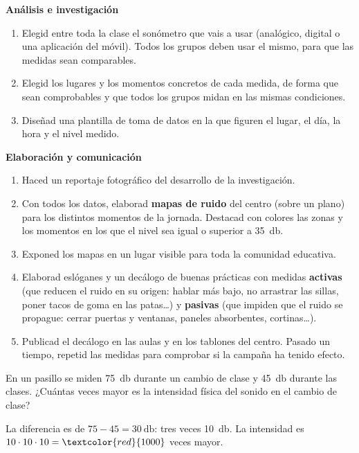 \textbf{Análisis e investigación}
\begin{enumerate}[label=\numberballred]
    \item Elegid entre toda la clase el sonómetro que vais a usar (analógico, digital o una aplicación del móvil). Todos los grupos deben usar el mismo, para que las medidas sean comparables.
    \item Elegid los lugares y los momentos concretos de cada medida, de forma que sean comprobables y que todos los grupos midan en las mismas condiciones.
    \item Diseñad una plantilla de toma de datos en la que figuren el lugar, el día, la hora y el nivel medido.
\end{enumerate}

\textbf{Elaboración y comunicación}
\begin{enumerate}[label=\numberballred, resume]
    \item Haced un reportaje fotográfico del desarrollo de la investigación.
    \item Con todos los datos, elaborad \textbf{mapas de ruido} del centro (sobre un plano) para los distintos momentos de la jornada. Destacad con colores las zonas y los momentos en los que el nivel sea igual o superior a \qty{35}{\decibel}.
    \item Exponed los mapas en un lugar visible para toda la comunidad educativa.
    \item Elaborad eslóganes y un decálogo de buenas prácticas con medidas \textbf{activas} (que reducen el ruido en su origen: hablar más bajo, no arrastrar las sillas, poner tacos de goma en las patas\ldots) y \textbf{pasivas} (que impiden que el ruido se propague: cerrar puertas y ventanas, paneles absorbentes, cortinas\ldots).
    \item Publicad el decálogo en las aulas y en los tablones del centro. Pasado un tiempo, repetid las medidas para comprobar si la campaña ha tenido efecto.
\end{enumerate}

\begin{exercise}
    En un pasillo se miden \qty{75}{\decibel} durante un cambio de clase y \qty{45}{\decibel} durante las clases. ¿Cuántas veces mayor es la intensidad física del sonido en el cambio de clase?
    \begin{solu}
        La diferencia es de \(75 - 45 = \qty{30}{\decibel}\): tres veces \qty{10}{\decibel}. La intensidad es \(10 \cdot 10 \cdot 10 = \textcolor{red}{1000}\) veces mayor.
    \end{solu}
\end{exercise}

